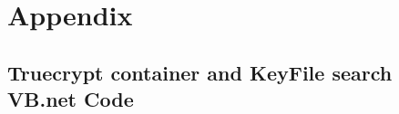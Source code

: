 \section{Appendix}
\subsection{Truecrypt container and KeyFile search VB.net Code}
\inputminted{vbnet}{appendix/TrueCryptFileFind.vb}